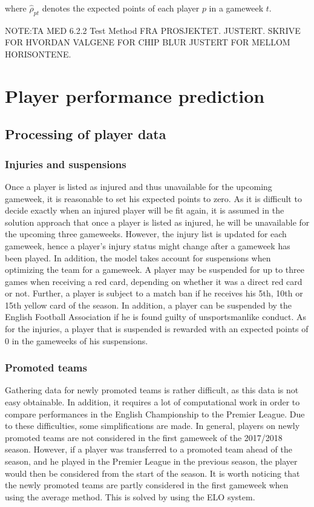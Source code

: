 where $\hat{\rho}_{pt}$ denotes the expected points of each player $p$ in a gameweek $t$.

\newpar

NOTE:TA MED 6.2.2 Test Method FRA PROSJEKTET. JUSTERT. SKRIVE FOR HVORDAN VALGENE FOR CHIP BLUR JUSTERT FOR MELLOM HORISONTENE.


\section{Player performance prediction}
\subsection{Processing of player data}
\subsubsection{Injuries and suspensions}
Once a player is listed as injured and thus unavailable for the upcoming gameweek, it is reasonable to set his expected points to zero. As it is difficult to decide exactly when an injured player will be fit again, it is assumed in the solution approach that once a player is listed as injured, he will be unavailable for the upcoming three gameweeks. However, the injury list is updated for each gameweek, hence a player's injury status might change after a gameweek has been played.  
\newpar
In addition, the model takes account for suspensions when optimizing the team for a gameweek. A player may be suspended for up to three games when receiving a red card, depending on whether it was a direct red card or not. Further, a player is subject to a match ban if he receives his 5th, 10th or 15th yellow card of the season. In addition, a player can be suspended by the English Football Association if he is found guilty of unsportsmanlike conduct. As for the injuries, a player that is suspended is rewarded with an expected points of 0 in the gameweeks of his suspensions. 

\subsubsection{Promoted teams}
Gathering data for newly promoted teams is rather difficult, as this data is not easy obtainable. In addition, it requires a lot of computational work in order to compare performances in the English Championship to the Premier League. Due to these difficulties, some simplifications are made. In general, players on newly promoted teams are not considered in the first gameweek of the 2017/2018 season. However, if a player was transferred to a promoted team ahead of the season, and he played in the Premier League in the previous season, the player would then be considered from the start of the season. It is worth noticing that the newly promoted teams are partly considered in the first gameweek when using the average method. This is solved by using the ELO system. 
